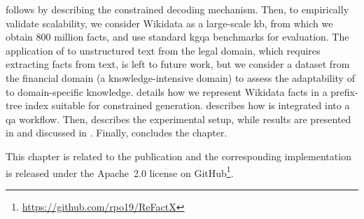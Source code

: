 
 follows by describing the constrained decoding mechanism. Then, to empirically validate  scalability, we consider Wikidata as a large-scale \ac{kb}, from which we obtain 800 million facts, and use standard \acf{kgqa} benchmarks for evaluation. The application of  to unstructured text from the legal domain, which requires extracting facts from text, is left to future work, but we consider a dataset from the financial domain (a knowledge-intensive domain) to assess the adaptability of  to domain-specific knowledge.  details how we represent Wikidata facts in a prefix-tree index suitable for constrained generation.  describes how  is integrated into a \ac{qa} workflow. Then,  describes the experimental setup, while results are presented in  and discussed in . Finally,  concludes the chapter.

This chapter is related to the publication \textcite{Pozzi2025ReFactX} and the corresponding implementation is released under the Apache~2.0 license on GitHub\footnote{\url{https://github.com/rpo19/ReFactX}}.
